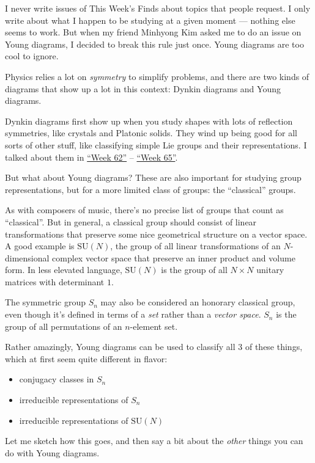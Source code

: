 \documentclass{article}
\def\tightlist{}
\begin{document}
I never write issues of This Week's Finds about topics that people
request. I only write about what I happen to be studying at a given
moment --- nothing else seems to work. But when my friend Minhyong Kim
asked me to do an issue on Young diagrams, I decided to break this rule
just once. Young diagrams are too cool to ignore.

Physics relies a lot on \emph{symmetry} to simplify problems, and there
are two kinds of diagrams that show up a lot in this context: Dynkin
diagrams and Young diagrams.

Dynkin diagrams first show up when you study shapes with lots of
reflection symmetries, like crystals and Platonic solids. They wind up
being good for all sorts of other stuff, like classifying simple Lie
groups and their representations. I talked about them in
\protect\hyperlink{week62}{``Week 62''} --
\protect\hyperlink{week65}{``Week 65''}.

But what about Young diagrams? These are also important for studying
group representations, but for a more limited class of groups: the
``classical'' groups.

As with composers of music, there's no precise list of groups that count
as ``classical''. But in general, a classical group should consist of
linear transformations that preserve some nice geometrical structure on
a vector space. A good example is \(\mathrm{SU}(N)\), the group of all
linear transformations of an \(N\)-dimensional complex vector space that
preserve an inner product and volume form. In less elevated language,
\(\mathrm{SU}(N)\) is the group of all \(N\times N\) unitary matrices
with determinant \(1\).

The symmetric group \(S_n\) may also be considered an honorary classical
group, even though it's defined in terms of a \emph{set} rather than a
\emph{vector space}. \(S_n\) is the group of all permutations of an
\(n\)-element set.

Rather amazingly, Young diagrams can be used to classify all 3 of these
things, which at first seem quite different in flavor:

\begin{itemize}
\tightlist
\item
  conjugacy classes in \(S_n\)
\item
  irreducible representations of \(S_n\)
\item
  irreducible representations of \(\mathrm{SU}(N)\)
\end{itemize}

Let me sketch how this goes, and then say a bit about the \emph{other}
things you can do with Young diagrams.
\end{document}
